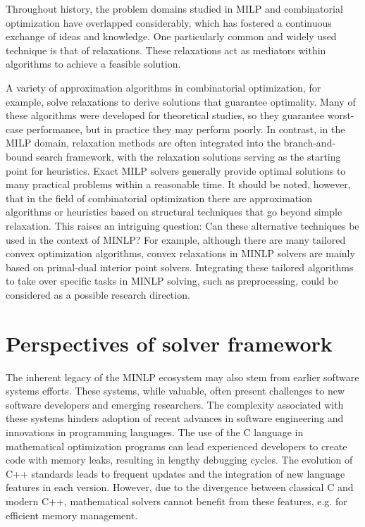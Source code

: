 Throughout history, the problem domains studied in MILP and combinatorial optimization have overlapped considerably, which has fostered a continuous exchange of ideas and knowledge. One particularly common and widely used technique is that of relaxations. These relaxations act as mediators within algorithms to achieve a feasible solution.

A variety of approximation algorithms in combinatorial optimization, for example, solve relaxations to derive solutions that guarantee optimality. Many of these algorithms were developed for theoretical studies, so they guarantee worst-case performance, but in practice they may perform poorly. In contrast, in the MILP domain, relaxation methods are often integrated into the branch-and-bound search framework, with the relaxation solutions serving as the starting point for heuristics. Exact MILP solvers generally provide optimal solutions to many practical problems within a reasonable time.
It should be noted, however, that in the field of combinatorial optimization there are approximation algorithms or heuristics based on structural techniques that go beyond simple relaxation. This raises an intriguing question: Can these alternative techniques be used in the context of MINLP? For example, although there are many tailored convex optimization algorithms, convex relaxations in MINLP solvers are mainly based on primal-dual interior point solvers. Integrating these tailored algorithms to take over specific tasks in MINLP solving, such as preprocessing, could be considered as a possible research direction.

\section{Perspectives of solver framework}

The inherent legacy of the MINLP ecosystem may also stem from earlier software systems efforts. These systems, while valuable, often present challenges to new software developers and emerging researchers. The complexity associated with these systems hinders adoption of recent advances in software engineering and innovations in programming languages.
The use of the C language in mathematical optimization programs can lead experienced developers to create code with memory leaks, resulting in lengthy debugging cycles. The evolution of C++ standards leads to frequent updates and the integration of new language features in each version. However, due to the divergence between classical C and modern C++, mathematical solvers cannot benefit from these features, e.g. for efficient memory management. 



